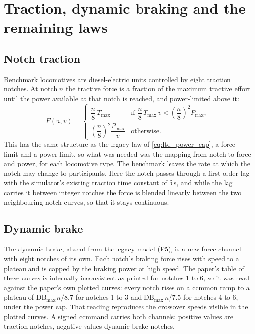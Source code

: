 \section{Traction, dynamic braking and the remaining laws}
\label{sec:bench_traction}

\subsection{Notch traction}

Benchmark locomotives are diesel-electric units controlled by eight traction notches. At notch $n$ the tractive force is a fraction of the maximum tractive effort until the power available at that notch is reached, and power-limited above it:
\begin{equation}
    F(n, v) =
    \begin{cases}
        \dfrac{n}{8}\,T_{\max} & \text{if } \dfrac{n}{8}\,T_{\max}\,v < \left(\dfrac{n}{8}\right)^{2} P_{\max}, \\[2ex]
        \left(\dfrac{n}{8}\right)^{2} \dfrac{P_{\max}}{v} & \text{otherwise.}
    \end{cases}
    \label{eq:bench_notch}
\end{equation}
This has the same structure as the legacy law of \cref{eq:ltd_power_cap}, a force limit and a power limit, so what was needed was the mapping from notch to force and power, for each locomotive type. The benchmark leaves the rate at which the notch may change to participants. Here the notch passes through a first-order lag with the simulator's existing traction time constant of 5\,s, and while the lag carries it between integer notches the force is blended linearly between the two neighbouring notch curves, so that it stays continuous.

\subsection{Dynamic brake}

The dynamic brake, absent from the legacy model (F5), is a new force channel with eight notches of its own. Each notch's braking force rises with speed to a plateau and is capped by the braking power at high speed. The paper's table of these curves is internally inconsistent as printed for notches 1 to 6, so it was read against the paper's own plotted curves: every notch rises on a common ramp to a plateau of $\mathrm{DB}_{\max}\,n/8.7$ for notches 1 to 3 and $\mathrm{DB}_{\max}\,n/7.5$ for notches 4 to 6, under the power cap. That reading reproduces the crossover speeds visible in the plotted curves. A signed command carries both channels: positive values are traction notches, negative values dynamic-brake notches.

